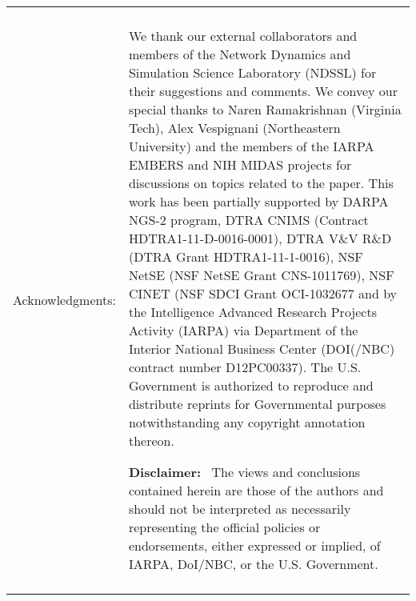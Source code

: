 \begin{titlepage}
{\begin{tabular}{r|p{}}
\rule[0.25in]{0pt}{0pt} & \\
Acknowledgments: & \small{
We thank our external collaborators and members of
the Network Dynamics and Simulation Science Laboratory (NDSSL) 
for their suggestions and comments. 
We convey our special thanks to Naren Ramakrishnan (Virginia Tech),
Alex Vespignani (Northeastern University) and the members of the 
IARPA EMBERS and NIH MIDAS projects for discussions on topics related to the paper.
This work has been partially supported by
DARPA NGS-2 program, DTRA CNIMS (Contract HDTRA1-11-D-0016-0001),
DTRA V\&V R\&D (DTRA Grant HDTRA1-11-1-0016),
NSF NetSE (NSF NetSE Grant CNS-1011769),
NSF CINET (NSF SDCI Grant OCI-1032677 and 
by the Intelligence
Advanced Research Projects Activity (IARPA) 
via Department of the Interior National Business Center
(DOI(/NBC) contract number D12PC00337).
The U.S. Government is authorized to reproduce and
distribute reprints for Governmental purposes notwithstanding 
any copyright annotation thereon.

\smallskip
\noindent
\textbf{Disclaimer:}~ The views and conclusions contained herein are those 
of the authors and should
not be interpreted as necessarily representing the 
official policies or endorsements, either expressed
or implied, of IARPA, DoI/NBC, or the U.S. Government.
%
} \\
\rule[0.25in]{0pt}{0pt} & \\
\end{tabular}

\vfill


\title{}
\author{}
\date{}


}

\bigskip\bigskip

\begin{center}
\end{center}

\thispagestyle{empty}

\end{titlepage}
